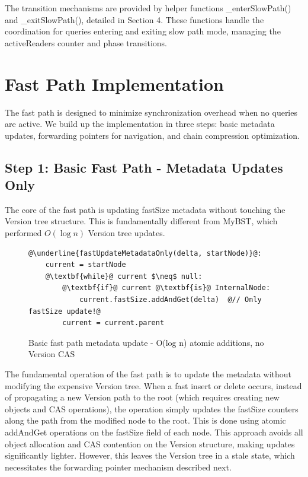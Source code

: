 \documentclass[acmsmall,screen,nonacm]{acmart}
\newcommand{\codestyle}[1]{{{\fontsize{9}{10}\ttfamily #1}}}
\begin{document}
The transition mechanisms are provided by helper functions \codestyle{\_enterSlowPath()} and \codestyle{\_exitSlowPath()}, detailed in Section 4. These functions handle the coordination for queries entering and exiting slow path mode, managing the \codestyle{activeReaders} counter and phase transitions.

\section{Fast Path Implementation}

The fast path is designed to minimize synchronization overhead when no queries are active. We build up the implementation in three steps: basic metadata updates, forwarding pointers for navigation, and chain compression optimization.

\subsection{Step 1: Basic Fast Path - Metadata Updates Only}

The core of the fast path is updating \codestyle{fastSize} metadata without touching the Version tree structure. This is fundamentally different from MyBST, which performed $O(\log n)$ Version tree updates.

\begin{figure}[H]
\begin{lstlisting}
@\underline{fastUpdateMetadataOnly(delta, startNode)}@:
    current = startNode
    @\textbf{while}@ current $\neq$ null:
        @\textbf{if}@ current @\textbf{is}@ InternalNode:
            current.fastSize.addAndGet(delta)  @// Only fastSize update!@
        current = current.parent
\end{lstlisting}
\caption{Basic fast path metadata update - O(log n) atomic additions, no Version CAS}
\label{fig:fast-metadata-basic}
\end{figure}

The fundamental operation of the fast path is to update the metadata without modifying the expensive Version tree. When a fast insert or delete occurs, instead of propagating a new Version path to the root (which requires creating new objects and CAS operations), the operation simply updates the \codestyle{fastSize} counters along the path from the modified node to the root. This is done using atomic \codestyle{addAndGet} operations on the \codestyle{fastSize} field of each node. This approach avoids all object allocation and CAS contention on the Version structure, making updates significantly lighter. However, this leaves the Version tree in a stale state, which necessitates the forwarding pointer mechanism described next.
\end{document}
